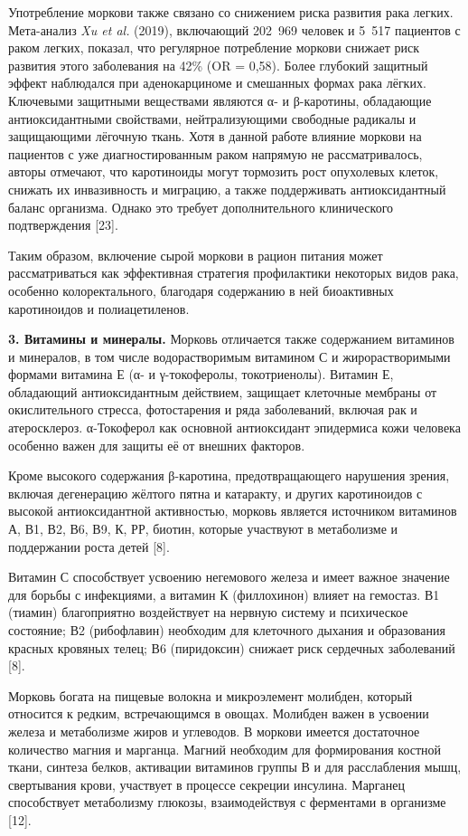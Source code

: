 \begin{multicols}{2}
Употребление моркови также связано со снижением риска развития рака
легких. Мета-анализ \emph{Xu et al.} (2019), включающий 202~969 человек
и 5~517 пациентов с раком легких, показал, что регулярное потребление
моркови снижает риск развития этого заболевания на 42\% (OR = 0,58).
Более глубокий защитный эффект наблюдался при аденокарциноме и смешанных
формах рака лёгких. Ключевыми защитными веществами являются α- и
β-каротины, обладающие антиоксидантными свойствами, нейтрализующими
свободные радикалы и защищающими лёгочную ткань. Хотя в данной работе
влияние моркови на пациентов с уже диагностированным раком напрямую не
рассматривалось, авторы отмечают, что каротиноиды могут тормозить рост
опухолевых клеток, снижать их инвазивность и миграцию, а также
поддерживать антиоксидантный баланс организма. Однако это требует
дополнительного клинического подтверждения {[}23{]}.

Таким образом, включение сырой моркови в рацион питания может
рассматриваться как эффективная стратегия профилактики некоторых видов
рака, особенно колоректального, благодаря содержанию в ней биоактивных
каротиноидов и полиацетиленов.

{\bfseries 3. Витамины и минералы.} Морковь отличается также содержанием
витаминов и минералов, в том числе водорастворимым витамином С и
жирорастворимыми формами витамина Е (α- и γ-токоферолы, токотриенолы).
Витамин Е, обладающий антиоксидантным действием, защищает клеточные
мембраны от окислительного стресса, фотостарения и ряда заболеваний,
включая рак и атеросклероз. α-Токоферол как основной антиоксидант
эпидермиса кожи человека особенно важен для защиты её от внешних
факторов.

Кроме высокого содержания β-каротина, предотвращающего нарушения зрения,
включая дегенерацию жёлтого пятна и катаракту, и других каротиноидов с
высокой антиоксидантной активностью, морковь является источником
витаминов А, В1, В2, В6, В9, К, РР, биотин, которые участвуют в
метаболизме и поддержании роста детей {[}8{]}.

Витамин С способствует усвоению негемового железа и имеет важное
значение для борьбы с инфекциями, а витамин К (филлохинон) влияет на
гемостаз. В1 (тиамин) благоприятно воздействует на нервную систему и
психическое состояние; В2 (рибофлавин) необходим для клеточного дыхания
и образования красных кровяных телец; В6 (пиридоксин) снижает риск
сердечных заболеваний {[}8{]}.

Морковь богата на пищевые волокна и микроэлемент молибден, который
относится к редким, встречающимся в овощах. Молибден важен в усвоении
железа и метаболизме жиров и углеводов. В моркови имеется достаточное
количество магния и марганца. Магний необходим для формирования костной
ткани, синтеза белков, активации витаминов группы В и для расслабления
мышц, свертывания крови, участвует в процессе секреции инсулина.
Марганец способствует метаболизму глюкозы, взаимодействуя с ферментами в
организме {[}12{]}.


\end{multicols}
